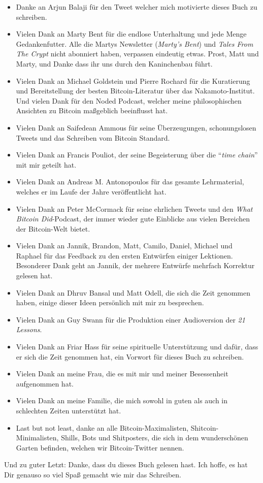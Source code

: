 \begin{itemize}
  \item Danke an Arjun Balaji für den Tweet welcher mich motivierte dieses Buch zu schreiben.
  \item Vielen Dank an Marty Bent für die endlose Unterhaltung und jede Menge Gedankenfutter. Alle die Martys Newsletter (\textit{Marty's Bent}) und \textit{Tales From The Crypt} nicht abonniert haben, verpassen eindeutig etwas. Prost, Matt und Marty, und Danke dass ihr uns durch den Kaninchenbau führt.
  \item Vielen Dank an Michael Goldstein und Pierre Rochard für die Kuratierung und Bereitstellung der besten Bitcoin-Literatur über das Nakamoto-Institut. Und vielen Dank für den Noded Podcast, welcher meine philosophischen Ansichten zu Bitcoin maßgeblich beeinflusst hat.
  \item Vielen Dank an Saifedean Ammous für seine Überzeugungen, schonungslosen Tweets und das Schreiben vom Bitcoin Standard.
  \item Vielen Dank an Francis Pouliot, der seine Begeisterung über die \enquote{\textit{time chain}} mit mir geteilt hat.
  \item Vielen Dank an Andreas M. Antonopoulos für das gesamte Lehrmaterial, welches er im Laufe der Jahre veröffentlicht hat.
  \item Vielen Dank an Peter McCormack für seine ehrlichen Tweets und den \textit{What Bitcoin Did}-Podcast, der immer wieder gute Einblicke aus vielen Bereichen der Bitcoin-Welt bietet.
  \item Vielen Dank an Jannik, Brandon, Matt, Camilo, Daniel, Michael und Raphael für das Feedback zu den ersten Entwürfen einiger Lektionen. Besonderer Dank geht an Jannik, der mehrere Entwürfe mehrfach Korrektur gelesen hat.
  \item Vielen Dank an Dhruv Bansal und Matt Odell, die sich die Zeit genommen haben, einige dieser Ideen persönlich mit mir zu besprechen.
  \item Vielen Dank an Guy Swann für die Produktion einer Audioversion der \textit{21 Lessons}.
  \item Vielen Dank an Friar Hass für seine spirituelle Unterstützung und dafür, dass er sich die Zeit genommen hat, ein Vorwort für dieses Buch zu schreiben.
  \item Vielen Dank an meine Frau, die es mit mir und meiner Besessenheit aufgenommen hat.
  \item Vielen Dank an meine Familie, die mich sowohl in guten als auch in schlechten Zeiten unterstützt hat.
  \item Last but not least, danke an alle Bitcoin-Maximalisten, Shitcoin-Minimalisten, Shills, Bots und Shitposters, die sich in dem wunderschönen Garten befinden, welchen wir Bitcoin-Twitter nennen.
\end{itemize}

Und zu guter Letzt: Danke, dass du dieses Buch gelesen hast. Ich hoffe, es hat Dir genauso so viel Spaß gemacht wie mir das Schreiben.
